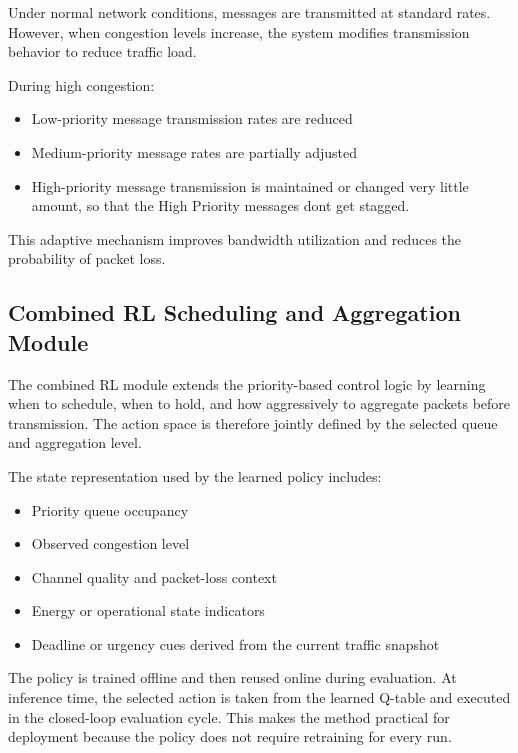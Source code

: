Under normal network conditions, messages are transmitted at 
standard rates. However, when congestion levels increase, the 
system modifies transmission behavior to reduce traffic load.

During high congestion:

\begin{itemize}

\item Low-priority message transmission rates are reduced

\item Medium-priority message rates are partially adjusted

\item High-priority message transmission is maintained or changed very little amount, so that the High Priority messages dont get stagged.

\end{itemize}

This adaptive mechanism improves bandwidth utilization and reduces 
the probability of packet loss.

\subsection{Combined RL Scheduling and Aggregation Module}

The combined RL module extends the priority-based control logic by 
learning when to schedule, when to hold, and how aggressively to 
aggregate packets before transmission. The action space is therefore 
jointly defined by the selected queue and aggregation level.

The state representation used by the learned policy includes:

\begin{itemize}
\item Priority queue occupancy
\item Observed congestion level
\item Channel quality and packet-loss context
\item Energy or operational state indicators
\item Deadline or urgency cues derived from the current traffic snapshot
\end{itemize}

The policy is trained offline and then reused online during evaluation. 
At inference time, the selected action is taken from the learned Q-table 
and executed in the closed-loop evaluation cycle. This makes the method 
practical for deployment because the policy does not require retraining 
for every run.

